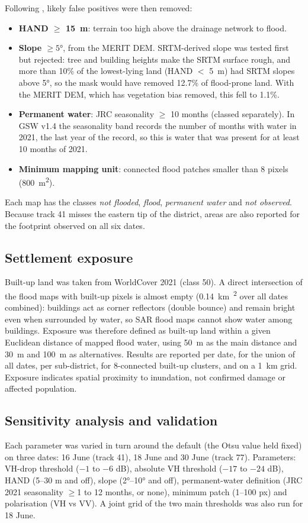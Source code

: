 \documentclass[11pt,a4paper]{article}
\newcommand{\kmsq}{km\textsuperscript{2}}
\begin{document}
Following \cite{twele}, likely false positives were then removed:
\begin{itemize}
\item \textbf{HAND $\geq$ \SI{15}{m}}: terrain too high above the drainage network to flood.
\item \textbf{Slope $\geq \ang{5}$}, from the MERIT DEM. SRTM-derived slope was tested first but rejected: tree and
building heights make the SRTM surface rough, and more than 10\% of the lowest-lying land (HAND $<$ \SI{5}{m})
had SRTM slopes above \ang{5}, so the mask would have removed 12.7\% of flood-prone land. With the MERIT DEM,
which has vegetation bias removed, this fell to 1.1\%.
\item \textbf{Permanent water}: JRC seasonality $\geq$ 10 months (classed separately). In GSW v1.4 the seasonality band
records the number of months with water in 2021, the last year of the record, so this is water that was present for at
least 10 months of 2021.
\item \textbf{Minimum mapping unit}: connected flood patches smaller than 8 pixels (\SI{800}{m^2}).
\end{itemize}
Each map has the classes \emph{not flooded}, \emph{flood}, \emph{permanent water} and \emph{not observed}.
Because track 41 misses the eastern tip of the district, areas are also reported for the footprint observed on all
six dates.

\subsection{Settlement exposure}
Built-up land was taken from WorldCover 2021 (class 50). A direct intersection of the flood maps with
built-up pixels is almost empty (\SI{0.14}{\kmsq} over all dates combined): buildings act as corner
reflectors (double bounce) and remain bright even when surrounded by water, so SAR flood maps cannot
show water among buildings. Exposure was therefore defined as built-up land within a given Euclidean
distance of mapped flood water, using \SI{50}{m} as the main distance and \SI{30}{m} and \SI{100}{m} as
alternatives. Results are reported per date, for the union of all dates, per sub-district, for 8-connected
built-up clusters, and on a \SI{1}{km} grid. Exposure indicates spatial proximity to inundation, not
confirmed damage or affected population.

\subsection{Sensitivity analysis and validation}
Each parameter was varied in turn around the default (the Otsu value held fixed) on three dates:
16 June (track 41), 18 June and 30 June (track 77). Parameters: VH-drop threshold ($-1$ to $-6$ dB),
absolute VH threshold ($-17$ to $-24$ dB), HAND (5--30 m and off), slope (\ang{2}--\ang{10} and off),
permanent-water definition (JRC 2021 seasonality $\geq$1 to 12 months, or none), minimum patch (1--100 px) and polarisation
(VH vs VV). A joint grid of the two main thresholds was also run for 18 June.
\end{document}
